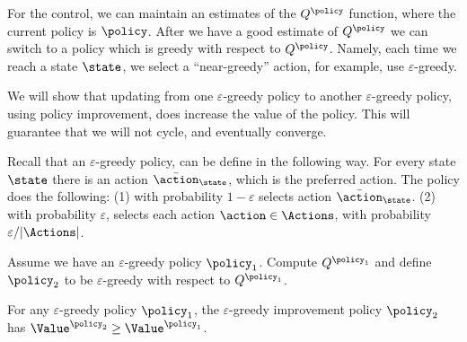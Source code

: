For the control, we can maintain an estimates of the $Q^\policy$
function, where the current policy is $\policy$. After we have a
good estimate of $Q^\policy$ we can switch to a policy which is
greedy with respect to $Q^\policy$. Namely, each time we reach a
state $\state$, we select a ``near-greedy'' action, for example, use
$\varepsilon$-greedy.

We will show that updating from one $\varepsilon$-greedy policy to
another $\varepsilon$-greedy policy, using policy improvement, does
increase the value of the policy. This will guarantee that we will not cycle, and eventually converge.

Recall that an $\varepsilon$-greedy policy, can be define in the
following way. For every state $\state$ there is an action
$\bar{\action}_\state$, which is the preferred action. The policy
does the following: (1) with probability $1-\varepsilon$ selects action $\bar{\action}_\state$. (2) with probability $\varepsilon$, selects
each action $\action \in \Actions$, with probability
$\varepsilon/|\Actions|$.

Assume we have an $\varepsilon$-greedy policy $\policy_1$. Compute
$Q^{\policy_1}$ and define $\policy_2$ to be $\varepsilon$-greedy
with respect to $Q^{\policy_1}$.

\begin{theorem}
For any $\varepsilon$-greedy policy $\policy_1$, the
$\varepsilon$-greedy improvement policy $\policy_2$ has
$\Value^{\policy_2}\geq \Value^{\policy_1}$.
\end{theorem}

